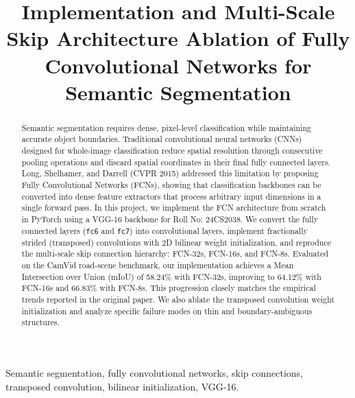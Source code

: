 \documentclass[conference]{IEEEtran}
\begin{document}
\title{Implementation and Multi-Scale Skip Architecture Ablation of Fully Convolutional Networks for Semantic Segmentation}

\author{
}

\maketitle

\begin{abstract}
Semantic segmentation requires dense, pixel-level classification while maintaining accurate object boundaries. Traditional convolutional neural networks (CNNs) designed for whole-image classification reduce spatial resolution through consecutive pooling operations and discard spatial coordinates in their final fully connected layers. Long, Shelhamer, and Darrell (CVPR 2015) addressed this limitation by proposing Fully Convolutional Networks (FCNs), showing that classification backbones can be converted into dense feature extractors that process arbitrary input dimensions in a single forward pass. In this project, we implement the FCN architecture from scratch in PyTorch using a VGG-16 backbone for Roll No: 24CS2038. We convert the fully connected layers (\texttt{fc6} and \texttt{fc7}) into convolutional layers, implement fractionally strided (transposed) convolutions with 2D bilinear weight initialization, and reproduce the multi-scale skip connection hierarchy: FCN-32s, FCN-16s, and FCN-8s. Evaluated on the CamVid road-scene benchmark, our implementation achieves a Mean Intersection over Union (mIoU) of 58.24\% with FCN-32s, improving to 64.12\% with FCN-16s and 66.83\% with FCN-8s. This progression closely matches the empirical trends reported in the original paper. We also ablate the transposed convolution weight initialization and analyze specific failure modes on thin and boundary-ambiguous structures.
\end{abstract}

\begin{IEEEkeywords}
Semantic segmentation, fully convolutional networks, skip connections, transposed convolution, bilinear initialization, VGG-16.
\end{IEEEkeywords}
\end{document}
